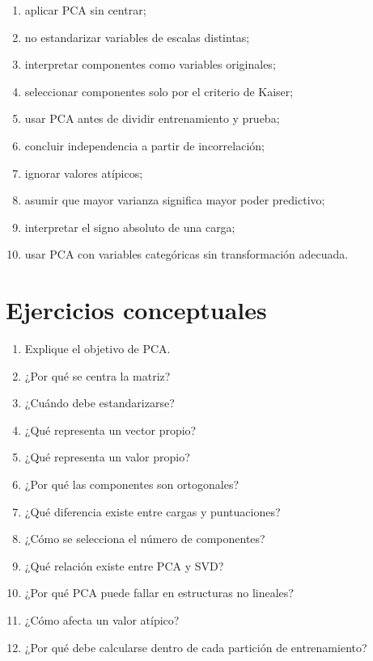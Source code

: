 \documentclass[
  spanish,
  10.5pt,
  letterpaper,
  DIV=11,
  numbers=noendperiod,
  oneside,
  open=any]{scrreprt}
\providecommand{\tightlist}{%
  \setlength{\itemsep}{0pt}\setlength{\parskip}{0pt}}
\theoremstyle{definition}
\theoremstyle{definition}
\theoremstyle{plain}
\theoremstyle{remark}
\begin{document}
\begin{enumerate}
\def\labelenumi{\arabic{enumi}.}
\tightlist
\item
  aplicar PCA sin centrar;
\item
  no estandarizar variables de escalas distintas;
\item
  interpretar componentes como variables originales;
\item
  seleccionar componentes solo por el criterio de Kaiser;
\item
  usar PCA antes de dividir entrenamiento y prueba;
\item
  concluir independencia a partir de incorrelación;
\item
  ignorar valores atípicos;
\item
  asumir que mayor varianza significa mayor poder predictivo;
\item
  interpretar el signo absoluto de una carga;
\item
  usar PCA con variables categóricas sin transformación adecuada.
\end{enumerate}

\section*{Ejercicios conceptuales}\label{ejercicios-conceptuales-15}


\begin{enumerate}
\def\labelenumi{\arabic{enumi}.}
\tightlist
\item
  Explique el objetivo de PCA.
\item
  ¿Por qué se centra la matriz?
\item
  ¿Cuándo debe estandarizarse?
\item
  ¿Qué representa un vector propio?
\item
  ¿Qué representa un valor propio?
\item
  ¿Por qué las componentes son ortogonales?
\item
  ¿Qué diferencia existe entre cargas y puntuaciones?
\item
  ¿Cómo se selecciona el número de componentes?
\item
  ¿Qué relación existe entre PCA y SVD?
\item
  ¿Por qué PCA puede fallar en estructuras no lineales?
\item
  ¿Cómo afecta un valor atípico?
\item
  ¿Por qué debe calcularse dentro de cada partición de entrenamiento?
\end{enumerate}
\end{document}
